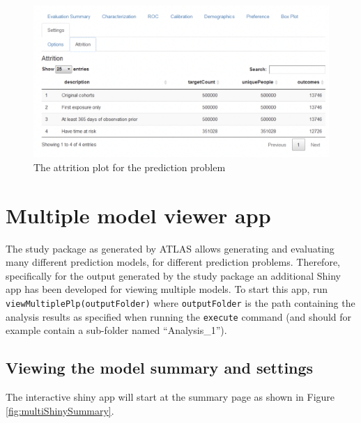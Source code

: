 \documentclass[11pt]{book}
\theoremstyle{definition}
\theoremstyle{definition}
\theoremstyle{definition}
\theoremstyle{remark}
\begin{document}
\begin{figure}

{\centering \includegraphics[width=1\linewidth]{images/PatientLevelPrediction/shiny/singleShiny/singleShinyAtt} 

}

\caption{The attrition plot for the prediction problem}\label{fig:shinyAtt}
\end{figure}

\hypertarget{multiple-model-viewer-app}{%
\section{Multiple model viewer app}\label{multiple-model-viewer-app}}

The study package as generated by ATLAS allows generating and evaluating many different prediction models, for different prediction problems. Therefore, specifically for the output generated by the study package an additional Shiny app has been developed for viewing multiple models. To start this app, run \texttt{viewMultiplePlp(outputFolder)} where \texttt{outputFolder} is the path containing the analysis results as specified when running the \texttt{execute} command (and should for example contain a sub-folder named ``Analysis\_1'').

\hypertarget{viewing-the-model-summary-and-settings}{%
\subsection{Viewing the model summary and settings}\label{viewing-the-model-summary-and-settings}}

The interactive shiny app will start at the summary page as shown in Figure \ref{fig:multiShinySummary}.
\end{document}
